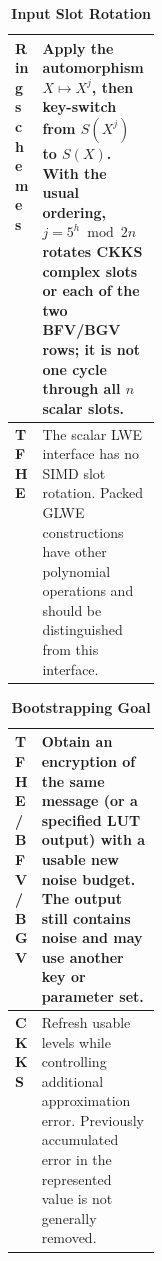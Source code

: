 \begin{table}[htbp]
\small
\renewcommand{\arraystretch}{1.15}
\begin{tabularx}{\linewidth}{|p{0.17\linewidth}|X|}
\hline
\textbf{Ring schemes}&Apply the automorphism $X\mapsto X^j$, then key-switch from $S(X^j)$ to $S(X)$. With the usual ordering, $j=5^h\bmod2n$ rotates CKKS complex slots or each of the two BFV/BGV rows; it is not one cycle through all $n$ scalar slots.\\\hline
\textbf{TFHE}&The scalar LWE interface has no SIMD slot rotation. Packed GLWE constructions have other polynomial operations and should be distinguished from this interface.\\\hline
\end{tabularx}
\caption{\textbf{Input Slot Rotation}}
\end{table}

\begin{table}[htbp]
\small
\renewcommand{\arraystretch}{1.15}
\begin{tabularx}{\linewidth}{|p{0.17\linewidth}|X|}
\hline
\textbf{TFHE / BFV / BGV}&Obtain an encryption of the same message (or a specified LUT output) with a usable new noise budget. The output still contains noise and may use another key or parameter set.\\\hline
\textbf{CKKS}&Refresh usable levels while controlling additional approximation error. Previously accumulated error in the represented value is not generally removed.\\\hline
\end{tabularx}
\caption{\textbf{Bootstrapping Goal}}
\end{table}

